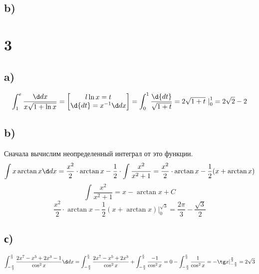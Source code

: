 	\subsection*{b)}
	\section*{3}
		\subsection*{a)}
	$$\int^e_1 \frac{\dx}{x\sqrt{1+\ln x}} = \begin{bmatrix}
			l\ln x = t \\
			\d{dt} = x^{-1}\dx \\
	\end{bmatrix}  = \int^1_0\frac{\d{dt}}{\sqrt{1+t}} = 2\sqrt{1+t}\text{ \textbar}^1_0 = 2\sqrt2-2$$
	\subsection*{b)}
	Сначала вычислим неопределенный интеграл от это	 функции.
	$$\int x\arctan x\dx = \frac{x^2}{2}\cdot \arctan x - \frac12\cdot\int\frac{x^2}{x^2+1} = \frac {x^2} {2}\cdot \arctan x - \frac12 (x+\arctan x)$$
	$$\int\frac{x^2}{x^2+1} =x - \arctan x+C$$
	$$\frac {x^2} {2}\cdot \arctan x - \frac12 (x+\arctan x)|^{\sqrt{3}}_0 = \frac{2\pi}{3}-\frac{\sqrt3}{2}$$
		\subsection*{с)}
		$$\int_{-\frac\pi3}^{\frac\pi3} \frac{2x^7-x^5+2x^3-1}{\cos^2x}\dx =\int_{-\frac\pi3}^{\frac\pi3} \frac{2x^7-x^5+2x^3}{\cos^2x} + \int_{-\frac\pi3}^{\frac\pi3} \frac{-1}{\cos^2x} = 0 - \int_{-\frac\pi3}^{\frac\pi3} \frac{1}{\cos^2x} = -\tg x|_{-\frac\pi3}^{\frac\pi3} = 2\sqrt3$$ 
